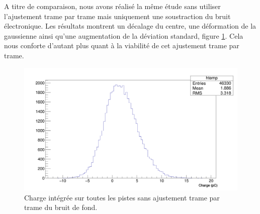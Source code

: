 \documentclass[a4paper,11pt]{article}
\begin{document}
A titre de comparaison, nous avons réalisé la même étude sans utiliser l'ajustement trame par trame mais uniquement une soustraction du bruit électronique. 
Les résultats montrent un décalage du centre, une déformation de la gaussienne ainsi qu'une augmentation de la déviation standard, figure \ref{fig:canvaspp}.
Cela nous conforte d'autant plus quant à la viabilité de cet ajustement trame par trame.
\begin{figure}[h]
\begin{center}
\includegraphics[scale=0.2]{Canvas_1pp.png} 
\caption{\label{fig:canvaspp}\footnotesize{Charge intégrée sur toutes les pistes sans ajustement trame par trame du bruit de fond.}}
\end{center}
\end{figure}
\end{document}
